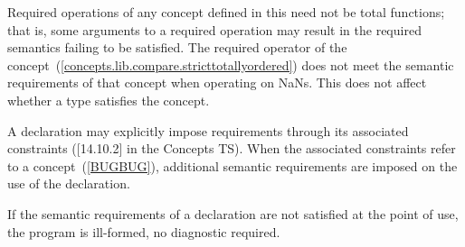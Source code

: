 {\color{newclr}
\pnum
Required operations of any concept defined in this  need not be
total functions; that is, some arguments to a required operation may
result in the required semantics failing to be satisfied. \enterexample
The required \tcode{<} operator of the 
concept~(\ref{concepts.lib.compare.stricttotallyordered}) does not meet the
semantic requirements of that concept when operating on NaNs.\exitexample
This does not affect whether a type satisfies the concept.

\pnum
A declaration may explicitly impose requirements through its associated
constraints ([14.10.2] in the Concepts TS). When the associated constraints
refer to a concept~(\ref{BUGBUG}), additional semantic requirements are
imposed on the use of the declaration.

\pnum
If the semantic requirements of a declaration are not satisfied at the
point of use, the program is ill-formed, no diagnostic required.
}
